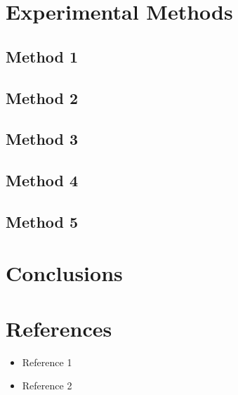 \documentclass{report}
\begin{document}
\chapter{Experimental Methods}
\section{Method 1}
\section{Method 2}
\section{Method 3}
\section{Method 4}
\section{Method 5}

\chapter{Conclusions}

\newpage
{}
\chapter*{References}
\begin{itemize}
    \item Reference 1
    \item Reference 2
\end{itemize}

\newpage
{}
\listoffigures
\end{document}
